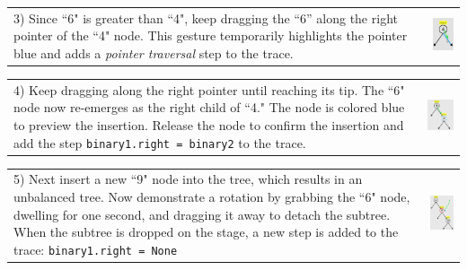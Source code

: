 \noindent \begin{tabular}{m{6.2cm} m{1.8cm}}

3) Since ``6" is greater than ``4", keep dragging the ``6'' along the
right pointer of the ``4" node. This gesture temporarily highlights the pointer
blue and adds a \emph{pointer traversal} step to the trace.

& \includegraphics[width=1.8cm]{img/examples/bst-3.png}
\end{tabular}

\noindent \begin{tabular}{m{4.6cm} m{3.4cm}}

4) Keep dragging along the right pointer until reaching its tip. The
``6" node now re-emerges as the right child of ``4." The node is colored blue to
preview the insertion. Release the node to confirm the insertion and
add the step \texttt{binary1.right = binary2} to the trace.

& \includegraphics[width=3.4cm]{img/examples/bst-4.png}
\end{tabular}

\noindent \begin{tabular}{m{4.6cm} m{3.4cm}}

5) Next insert a new ``9" node into the tree, which results in an
unbalanced tree. Now demonstrate a rotation by grabbing the ``6" node,
dwelling for one second, and dragging it away to detach the subtree.
When the subtree is dropped on the stage, a new step is added to the
trace: \texttt{binary1.right = None}

& \includegraphics[width=3.4cm]{img/examples/bst-5.png}
\end{tabular}

